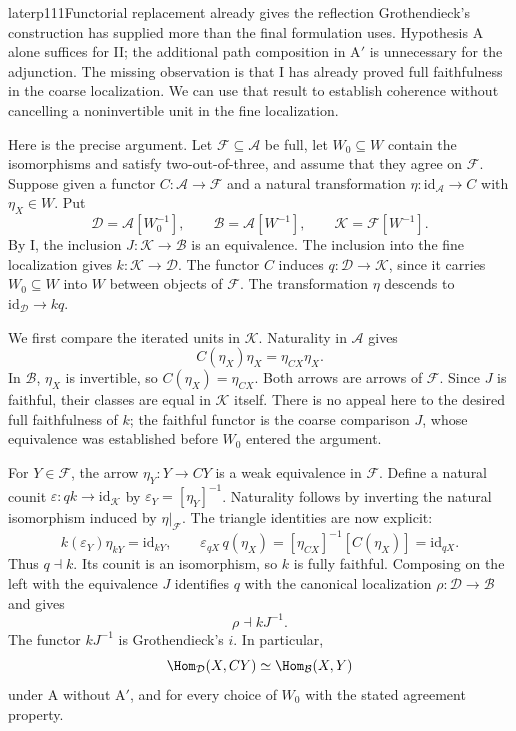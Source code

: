 \begin{dcomment}{later}{p111}{Functorial replacement already gives the reflection}
Grothendieck's construction has supplied more than the final formulation uses. Hypothesis A alone suffices for II; the additional path composition in A$'$ is unnecessary for the adjunction. The missing observation is that I has already proved full faithfulness in the coarse localization. We can use that result to establish coherence without cancelling a noninvertible unit in the fine localization.

Here is the precise argument. Let $\mathcal F\subseteq\mathcal A$ be full, let $W_0\subseteq W$ contain the isomorphisms and satisfy two-out-of-three, and assume that they agree on $\mathcal F$. Suppose given a functor $C:\mathcal A\to\mathcal F$ and a natural transformation $\eta:\mathrm{id}_{\mathcal A}\to C$ with $\eta_X\in W$. Put
\[
 \mathcal D=\mathcal A[W_0^{-1}],\qquad
 \mathcal B=\mathcal A[W^{-1}],\qquad
 \mathcal K=\mathcal F[W^{-1}].
\]
By I, the inclusion $J:\mathcal K\to\mathcal B$ is an equivalence. The inclusion into the fine localization gives $k:\mathcal K\to\mathcal D$. The functor $C$ induces $q:\mathcal D\to\mathcal K$, since it carries $W_0\subseteq W$ into $W$ between objects of $\mathcal F$. The transformation $\eta$ descends to $\mathrm{id}_{\mathcal D}\to kq$.

We first compare the iterated units in $\mathcal K$. Naturality in $\mathcal A$ gives
\[
 C(\eta_X)\eta_X=\eta_{CX}\eta_X.
\]
In $\mathcal B$, $\eta_X$ is invertible, so $C(\eta_X)=\eta_{CX}$. Both arrows are arrows of $\mathcal F$. Since $J$ is faithful, their classes are equal in $\mathcal K$ itself. There is no appeal here to the desired full faithfulness of $k$; the faithful functor is the coarse comparison $J$, whose equivalence was established before $W_0$ entered the argument.

For $Y\in\mathcal F$, the arrow $\eta_Y:Y\to CY$ is a weak equivalence in $\mathcal F$. Define a natural counit $\varepsilon:qk\to\mathrm{id}_{\mathcal K}$ by $\varepsilon_Y=[\eta_Y]^{-1}$. Naturality follows by inverting the natural isomorphism induced by $\eta|_{\mathcal F}$. The triangle identities are now explicit:
\[
 k(\varepsilon_Y)\eta_{kY}=\mathrm{id}_{kY},
 \qquad
 \varepsilon_{qX}\,q(\eta_X)
   =[\eta_{CX}]^{-1}[C(\eta_X)]
   =\mathrm{id}_{qX}.
\]
Thus $q\dashv k$. Its counit is an isomorphism, so $k$ is fully faithful. Composing on the left with the equivalence $J$ identifies $q$ with the canonical localization $\rho:\mathcal D\to\mathcal B$ and gives
\[
 \rho\dashv kJ^{-1}.
\]
The functor $kJ^{-1}$ is Grothendieck's $i$. In particular,
\[
 \Hom_{\mathcal D}(X,CY)
 \simeq \Hom_{\mathcal B}(X,Y)
\]
under A without A$'$, and for every choice of $W_0$ with the stated agreement property.


\end{dcomment}
